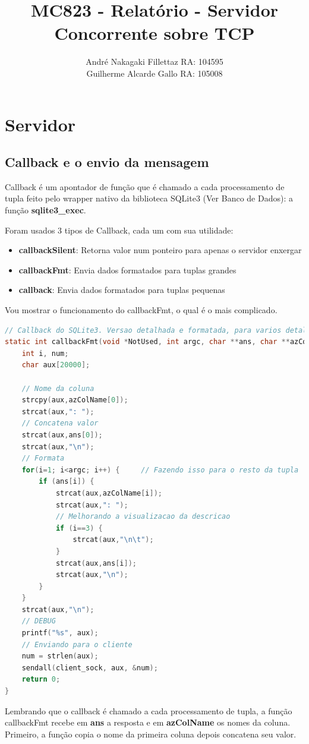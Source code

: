 \documentclass[10pt,a4paper]{report}
\author{André Nakagaki Fillettaz RA: 104595 \\ Guilherme Alcarde Gallo RA: 105008}
\title{MC823 - Relat\'orio - Servidor Concorrente sobre TCP}
\begin{document}
\maketitle

\tableofcontents


\chapter{Servidor}

\section{Callback e o envio da mensagem}

Callback é um apontador de função que é chamado a cada processamento de tupla feito pelo wrapper nativo da biblioteca SQLite3 (Ver Banco de Dados): a função \textbf{sqlite3\_exec}.

Foram usados 3 tipos de Callback, cada um com sua utilidade:
\begin{itemize}
  \item \textbf{callbackSilent}: Retorna valor num ponteiro para apenas o servidor enxergar
  \item \textbf{callbackFmt}: Envia dados formatados para tuplas grandes
  \item \textbf{callback}: Envia dados formatados para tuplas pequenas
\end{itemize}

Vou mostrar o funcionamento do callbackFmt, o qual é o mais complicado.
\begin{lstlisting}[language=C,label=DescriptiveLabel]
// Callback do SQLite3. Versao detalhada e formatada, para varios detalhes
static int callbackFmt(void *NotUsed, int argc, char **ans, char **azColName){
	int i, num;
	char aux[20000];
	
	// Nome da coluna
	strcpy(aux,azColName[0]);
	strcat(aux,": ");
	// Concatena valor
	strcat(aux,ans[0]);
	strcat(aux,"\n");
	// Formata
	for(i=1; i<argc; i++) {		// Fazendo isso para o resto da tupla
		if (ans[i]) {
			strcat(aux,azColName[i]);
			strcat(aux,": ");
			// Melhorando a visualizacao da descricao
			if (i==3) {
				strcat(aux,"\n\t");
			}
			strcat(aux,ans[i]);
			strcat(aux,"\n");
		}
	}
	strcat(aux,"\n");
	// DEBUG
	printf("%s", aux);
	// Enviando para o cliente
	num = strlen(aux);
	sendall(client_sock, aux, &num);
	return 0;
}
\end{lstlisting}
	Lembrando que o callback é chamado a cada processamento de tupla, a função callbackFmt recebe em \textbf{ans} a resposta e em \textbf{azColName} os nomes da coluna.
Primeiro, a função copia o nome da primeira coluna depois concatena seu valor.
\end{document}
